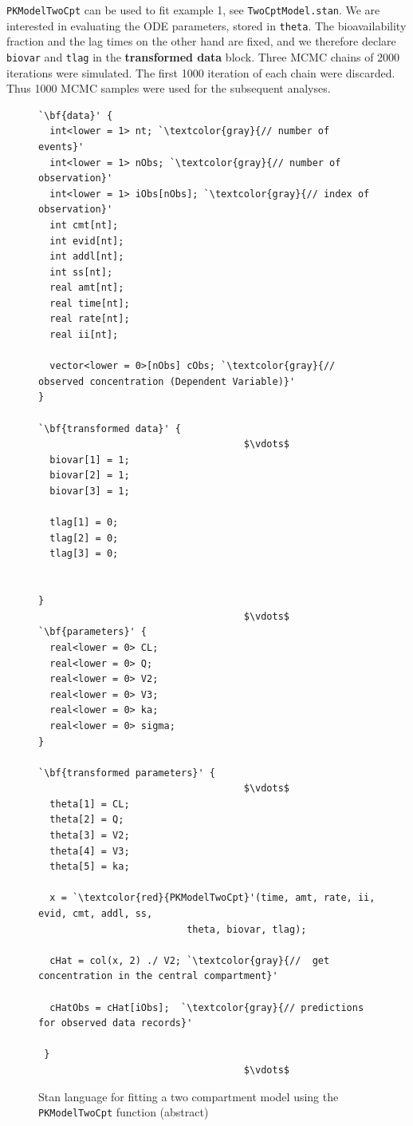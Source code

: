 \documentclass[11pt]{amsart}
\newenvironment{fmpage}[1]
     {\begin{lrbox}{\fmbox}\begin{minipage}{#1}}
     {\end{minipage}\end{lrbox}\fbox{\usebox{\fmbox}}}
\begin{document}
\texttt{PKModelTwoCpt} can be used to fit example 1, see \texttt{TwoCptModel.stan}. We are interested in evaluating the ODE parameters, stored in \texttt{theta}. The bioavailability fraction and the lag times on the other hand are fixed, and we therefore declare \texttt{biovar} and \texttt{tlag} in the \textbf{transformed data} block. Three MCMC chains of 2000 iterations were simulated. The first 1000 iteration of each chain were discarded. Thus 1000 MCMC samples were used for the subsequent analyses.

\begin{figure}[htbp]
\begin{center}
\begin{small}
\begin{fmpage}{\textwidth - .75in}
\begin{lstlisting}[basicstyle=\footnotesize\ttfamily,mathescape=true,flexiblecolumns=true,frame=single,escapeinside=`']
`\bf{data}' {
  int<lower = 1> nt; `\textcolor{gray}{// number of events}'
  int<lower = 1> nObs; `\textcolor{gray}{// number of observation}'
  int<lower = 1> iObs[nObs]; `\textcolor{gray}{// index of observation}'
  int cmt[nt];
  int evid[nt];
  int addl[nt];
  int ss[nt];
  real amt[nt];
  real time[nt];
  real rate[nt];
  real ii[nt];
  
  vector<lower = 0>[nObs] cObs; `\textcolor{gray}{//  observed concentration (Dependent Variable)}'
}

`\bf{transformed data}' {
                                    $\vdots$
  biovar[1] = 1;
  biovar[2] = 1;
  biovar[3] = 1;
  
  tlag[1] = 0;
  tlag[2] = 0;
  tlag[3] = 0;                                    
                                    
                                     
}
                                    $\vdots$ 
`\bf{parameters}' {
  real<lower = 0> CL;
  real<lower = 0> Q;
  real<lower = 0> V2;
  real<lower = 0> V3;
  real<lower = 0> ka;
  real<lower = 0> sigma;
}

`\bf{transformed parameters}' {
                                    $\vdots$ 
  theta[1] = CL;
  theta[2] = Q;
  theta[3] = V2;
  theta[4] = V3;
  theta[5] = ka;

  x = `\textcolor{red}{PKModelTwoCpt}'(time, amt, rate, ii, evid, cmt, addl, ss, 
                          theta, biovar, tlag);

  cHat = col(x, 2) ./ V2; `\textcolor{gray}{//  get concentration in the central compartment}'
  
  cHatObs = cHat[iObs];  `\textcolor{gray}{// predictions for observed data records}'
 
 }
                                    $\vdots$ 
\end{lstlisting}
\end{fmpage}
\end{small}
\caption{Stan language for fitting a two compartment model using the \texttt{PKModelTwoCpt} function (abstract)}
\end{center}
\label{TwoCptCode}
\end{figure}
\end{document}
